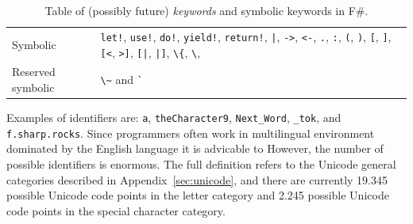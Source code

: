 \documentclass[fsharpnotes.tex]{subfiles}
\begin{document}
\begin{table}
\begin{tabularx}{\textwidth}{|l|>{\raggedright\arraybackslash}X|}
 Symbolic
 & \mbox{\lstinline{let!},} \mbox{\lstinline{use!},} \mbox{\lstinline{do!},} \mbox{\lstinline{yield!},} \mbox{\lstinline{return!},} \mbox{\lstinline{|},} \mbox{\lstinline{->},} \mbox{\lstinline{<-},} \mbox{\lstinline{.},} \mbox{\lstinline{:},} \mbox{\lstinline{(},} \mbox{\lstinline{)},} \mbox{\lstinline{[},} \mbox{\lstinline{]},} \mbox{\lstinline{[<},} \mbox{\lstinline{>]},} \mbox{\lstinline{[|},} \mbox{\lstinline{|]},} \mbox{\lstinline{\{},} \mbox{\lstinline{\}},} \mbox{\lstinline{'},} \mbox{\lstinline{#},} \mbox{\lstinline{:?>},} \mbox{\lstinline{:?},} \mbox{\lstinline{:>},} \mbox{\lstinline{..},} \mbox{\lstinline{::},} \mbox{\lstinline{:=},} \mbox{\lstinline{;;},} \mbox{\lstinline{;},} \mbox{\lstinline{=},} \mbox{\lstinline{_},} \mbox{\lstinline{?},} \mbox{\lstinline{??},} \mbox{\lstinline{(*)},} \mbox{\lstinline{<@},} \mbox{\lstinline{@>},} \mbox{\lstinline{<@@},} and \mbox{\lstinline{@@>}.} \\
 Reserved symbolic
 &\mbox{\lstinline{\~}} and \mbox{\lstinline{`}}\\
    \hline
  \end{tabularx}
  \caption{Table of (possibly future) \emph{keywords} and symbolic keywords in F\#.}
  \label{tab:keywords}
\end{table}
Examples of identifiers are: \lstinline{a}, \lstinline{theCharacter9}, \lstinline{Next_Word}, \lstinline{_tok}, and \lstinline{f.sharp.rocks}.  Since programmers often work in multilingual environment dominated by the English language it is advicable to   However, the number of possible identifiers is enormous. The full definition refers to the Unicode general categories described in Appendix~\ref{sec:unicode}, and there are currently 19.345 possible Unicode code points in the letter category and 2.245 possible Unicode code points in the special character category.
\end{document}
